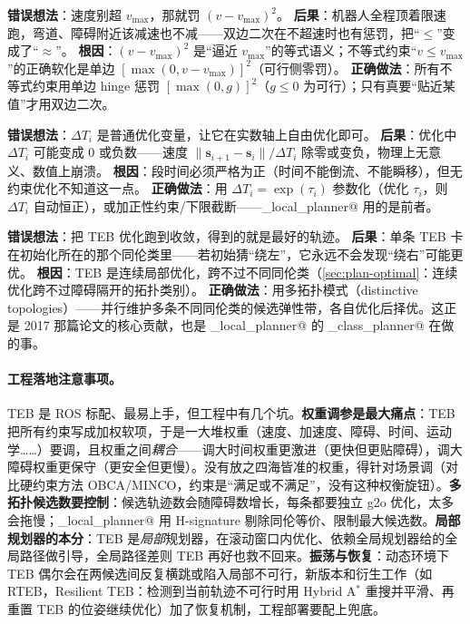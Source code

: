 \begin{pitfall}
\textbf{错误想法}：速度别超 $v_{\max}$，那就罚 $(v-v_{\max})^2$。\;
\textbf{后果}：机器人全程顶着限速跑，弯道、障碍附近该减速也不减——双边二次在不超速时也有惩罚，把“$\le$”变成了“$\approx$”。\;
\textbf{根因}：$(v-v_{\max})^2$ 是“逼近 $v_{\max}$”的等式语义；不等式约束“$v\le v_{\max}$”的正确软化是单边 $[\max(0,v-v_{\max})]^2$（可行侧零罚）。\;
\textbf{正确做法}：所有不等式约束用单边 hinge 惩罚 $[\max(0,g)]^2$（$g\le 0$ 为可行）；只有真要“贴近某值”才用双边二次。
\end{pitfall}

\begin{pitfall}
\textbf{错误想法}：$\Delta T_i$ 是普通优化变量，让它在实数轴上自由优化即可。\;
\textbf{后果}：优化中 $\Delta T_i$ 可能变成 $0$ 或负数——速度 $\|\mathbf s_{i+1}-\mathbf s_i\|/\Delta T_i$ 除零或变负，物理上无意义、数值上崩溃。\;
\textbf{根因}：段时间必须严格为正（时间不能倒流、不能瞬移），但无约束优化不知道这一点。\;
\textbf{正确做法}：用 $\Delta T_i=\exp(\tau_i)$ 参数化（优化 $\tau_i$，则 $\Delta T_i$ 自动恒正），或加正性约束/下限截断——\verb@teb_local_planner@ 用的是前者。
\end{pitfall}

\begin{pitfall}
\textbf{错误想法}：把 TEB 优化跑到收敛，得到的就是最好的轨迹。\;
\textbf{后果}：单条 TEB 卡在初始化所在的那个同伦类里——若初始猜“绕左”，它永远不会发现“绕右”可能更优。\;
\textbf{根因}：TEB 是连续局部优化，跨不过不同同伦类（\cref{sec:plan-optimal}：连续优化跨不过障碍隔开的拓扑类别）。\;
\textbf{正确做法}：用多拓扑模式（distinctive topologies）——并行维护多条不同同伦类的候选弹性带，各自优化后择优。这正是 2017 那篇论文的核心贡献，也是 \verb@teb_local_planner@ 的 \verb@homotopy_class_planner@ 在做的事。
\end{pitfall}

\paragraph{工程落地注意事项。}
TEB 是 ROS 标配、最易上手，但工程中有几个坑。\textbf{权重调参是最大痛点}：TEB 把所有约束写成加权软项，于是一大堆权重（速度、加速度、障碍、时间、运动学……）要调，且权重之间\emph{耦合}——调大时间权重更激进（更快但更贴障碍），调大障碍权重更保守（更安全但更慢）。没有放之四海皆准的权重，得针对场景调（对比硬约束方法 OBCA/MINCO，约束是“满足或不满足”，没有这种权衡旋钮）。\textbf{多拓扑候选数要控制}：候选轨迹数会随障碍数增长，每条都要独立 g2o 优化，太多会拖慢；\verb@teb_local_planner@ 用 H-signature 剔除同伦等价、限制最大候选数。\textbf{局部规划器的本分}：TEB 是\emph{局部}规划器，在滚动窗口内优化、依赖全局规划器给的全局路径做引导，全局路径差则 TEB 再好也救不回来。\textbf{振荡与恢复}：动态环境下 TEB 偶尔会在两候选间反复横跳或陷入局部不可行，新版本和衍生工作（如 RTEB，Resilient TEB\cite{kulathunga2025rteb}：检测到当前轨迹不可行时用 Hybrid A$^*$ 重搜并平滑、再重置 TEB 的位姿继续优化）加了恢复机制，工程部署要配上兜底。

